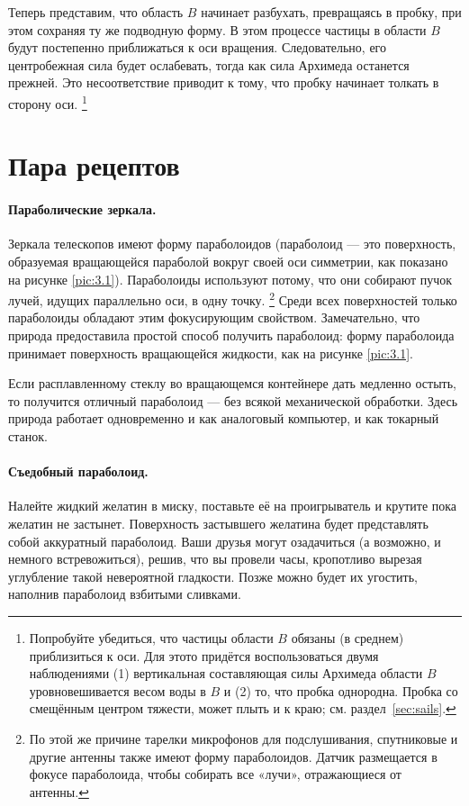 Теперь представим, что область $B$ начинает разбухать, превращаясь в пробку, при этом сохраняя ту же подводную форму.
В этом процессе частицы в области $B$ будут постепенно приближаться к оси вращения.
Следовательно, его центробежная сила будет ослабевать, тогда как сила Архимеда останется прежней.
Это несоответствие приводит к тому, что пробку начинает толкать в сторону оси.%
\footnote{Попробуйте убедиться, что частицы области $B$ обязаны (в среднем) приблизиться к оси.
Для этото придётся воспользоваться двумя наблюдениями
(1) вертикальная составляющая силы Архимеда области $B$ уровновешивается весом воды в $B$ и
(2) то, что пробка однородна.
Пробка со смещённым центром тяжести, может плыть и к краю;
см. раздел~\ref{sec:sails}.
\pr}

\section{Пара рецептов}\label{Пара рецептов}

\paragraph{Параболические зеркала.}
Зеркала телескопов имеют форму параболоидов (параболоид — это поверхность, образуемая вращающейся параболой вокруг своей оси симметрии, как показано на рисунке \ref{pic:3.1}).
Параболоиды используют потому, что они собирают пучок лучей, идущих параллельно оси, в одну точку.%
\footnote{По этой же причине тарелки микрофонов для подслушивания, спутниковые и другие антенны также имеют форму параболоидов.
Датчик размещается в фокусе параболоида, чтобы собирать все «лучи», отражающиеся от антенны.}
Среди всех поверхностей только параболоиды обладают этим фокусирующим свойством.
Замечательно, что природа предоставила простой способ получить параболоид: форму параболоида принимает поверхность вращающейся жидкости, как на рисунке \ref{pic:3.1}.

Если расплавленному стеклу во вращающемся контейнере дать медленно остыть, то получится отличный параболоид — без всякой механической обработки.
Здесь природа работает одновременно и как аналоговый компьютер, и как токарный станок.

\paragraph{Съедобный параболоид.}
Налейте жидкий желатин в миску, поставьте её на проигрыватель и крутите пока желатин не застынет.
Поверхность застывшего желатина будет представлять собой аккуратный параболоид.
Ваши друзья могут озадачиться (а возможно, и немного встревожиться), решив, что вы провели часы, кропотливо вырезая углубление такой невероятной гладкости.
Позже можно будет их угостить, наполнив параболоид взбитыми сливками.

